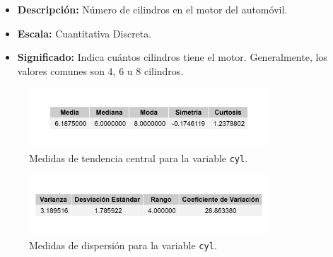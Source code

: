 \documentclass{article}
\begin{document}
\begin{enumerate}
	      \begin{itemize}
		      \item \textbf{Descripción:} Número de cilindros en el motor del automóvil.
		      \item \textbf{Escala:} Cuantitativa Discreta.
		      \item \textbf{Significado:} Indica cuántos cilindros tiene el motor. Generalmente, los valores comunes son 4, 6 u 8 cilindros.
	      \end{itemize}

	      \begin{figure}[H]
		      \centering
		      \includegraphics[width=0.8\textwidth]{MTC/cyl_central.png}
		      \caption{Medidas de tendencia central para la variable \texttt{cyl}.}
		      \label{fig:cyl_central}
	      \end{figure}

	      \begin{figure}[H]
		      \centering
		      \includegraphics[width=0.8\textwidth]{MTC/cyl_dispersion.png}
		      \caption{Medidas de dispersión para la variable \texttt{cyl}.}
		      \label{fig:cyl_dispersion}
	      \end{figure}


\end{enumerate}
\end{document}
